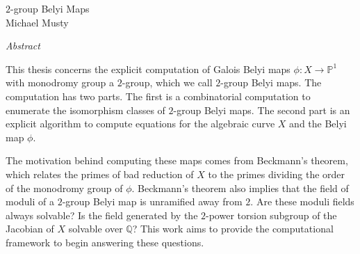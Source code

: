 \documentclass[12pt]{article}
\begin{document}
\thispagestyle{empty}
\begin{center}
 \Large $2$-group Belyi Maps\\
\large Michael Musty
\bigskip

\normalsize \textit{Abstract}
\end{center}
This thesis concerns the explicit computation
of Galois Belyi maps
$\phi\colon X\to\mathbb{P}^1$
with monodromy group
a $2$-group,
which we call $2$-group Belyi maps.
The computation has two parts.
The first is a combinatorial computation
to enumerate the isomorphism classes
of $2$-group Belyi maps.
The second part is an explicit algorithm
to compute equations for the algebraic curve
$X$ and the Belyi map $\phi$.
\par
The motivation behind computing these maps comes from Beckmann's theorem,
which relates the primes of bad reduction of
$X$ to the primes dividing the order of the monodromy group of $\phi$.
Beckmann's theorem also implies that the field of
moduli of a $2$-group Belyi map is unramified away from $2$.
Are these moduli fields always solvable?
Is the field generated by the $2$-power torsion
subgroup of the Jacobian of $X$ solvable over $\mathbb{Q}$?
This work aims to provide the computational framework
to begin answering these questions.



% 
% 
\end{document}
